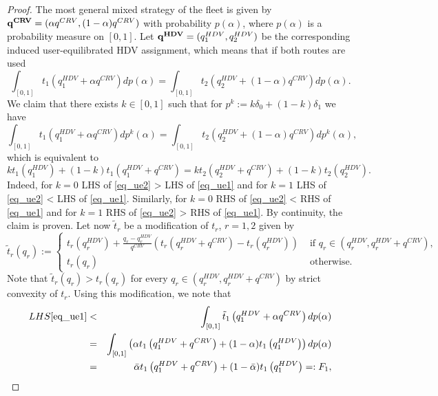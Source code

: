 \documentclass[a4paper,11pt]{article}
\begin{document}
\begin{proof}
The most general mixed strategy of the fleet is given by $\bold{q^{CRV}} = (\alpha q^{CRV}, (1-\alpha)q^{CRV})$ with probability $p(\alpha)$, where $p(\alpha)$ is a probability measure on $[0,1]$. Let $\bold{q^{HDV}} = (q^{HDV}_1, q^{HDV}_2)$ be the corresponding induced user-equilibrated HDV assignment, which means that if both routes are used 
\begin{equation}
\label{eq_ue1}
\int_{[0,1]} t_1\left(q_1^{HDV} + \alpha q^{CRV}\right) dp(\alpha) = \int_{[0,1]} t_2\left(q_2^{HDV} + (1-\alpha) q^{CRV}\right) dp(\alpha).
\end{equation}
\noindent We claim that there exists $k \in [0,1]$ such that for $p^k:= k\delta_0 + (1-k)\delta_1$ we have 
\begin{equation}
\label{eq_uepk}
\int_{[0,1]} t_1\left(q_1^{HDV} + \alpha q^{CRV}\right) dp^k(\alpha) = \int_{[0,1]} t_2\left(q_2^{HDV} + (1-\alpha) q^{CRV}\right) dp^k(\alpha),
\end{equation}
which is equivalent to 
\begin{equation}
\label{eq_ue2}
k t_1\left(q_1^{HDV}\right) + (1-k)t_1\left(q_1^{HDV} + q^{CRV}\right) = k t_2\left(q_2^{HDV} + q^{CRV}\right) + (1-k) t_2\left(q_2^{HDV}\right).
\end{equation} 
Indeed, for $k=0$ LHS of \eqref{eq_ue2} > LHS of \eqref{eq_ue1} and for $k=1$ LHS of \eqref{eq_ue2} < LHS of \eqref{eq_ue1}. Similarly, for $k=0$ RHS of \eqref{eq_ue2} < RHS of \eqref{eq_ue1} and for $k=1$ RHS of \eqref{eq_ue2} > RHS of \eqref{eq_ue1}. By continuity, the claim is proven. Let now $\tilde{t}_r$ be a modification of $t_r$, $r=1,2$ given by 
\begin{equation*}
\tilde{t}_r(q_r) := \begin{cases}
t_r\left(q_r^{HDV}\right) + \frac {q_r - q_r^{HDV}}{q^{CRV}}\left(t_r\left(q_r^{HDV}+q^{CRV}\right) - t_r\left(q_r^{HDV}\right)\right) & \mbox{ if } q_r \in (q_r^{HDV}, q_r^{HDV} + q^{CRV}),\\
t_r(q_r) & \mbox{ otherwise.}
\end{cases}
\end{equation*} 
Note that $\tilde{t}_r(q_r) > t_r(q_r)$ for every $q_r \in (q_r^{HDV}, q_r^{HDV} + q^{CRV})$ by strict convexity of $t_r$. Using this modification, we note that 
\begin{eqnarray*}
LHS\eqref{eq_ue1} &<& \int_{[0,1]} \tilde{t}_1\left(q_1^{HDV} + \alpha q^{CRV}\right) dp(\alpha) \\ &=& \int_{[0,1]} \left(\alpha t_1\left(q_1^{HDV} + q^{CRV}\right) + (1-\alpha)t_1\left(q_1^{HDV}\right)\right) dp(\alpha) \\ &=& \bar{\alpha} t_1\left(q_1^{HDV} + q^{CRV}\right) + (1-\bar{\alpha})t_1\left(q_1^{HDV}\right) =: F_1,

\end{eqnarray*}
\end{proof}
\end{document}
